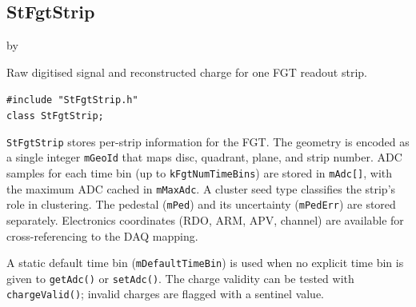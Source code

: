 \documentclass[twoside]{article}
\newcommand{\entrylabel}[1]{\mbox{\textbf{{#1}}}\hfil}%
\newenvironment{entry}
{\begin{list}{}%
    {\renewcommand{\makelabel}{\entrylabel}%
     \setlength{\labelwidth}{90pt}%
     \setlength{\leftmargin}{\labelwidth}
     \advance\leftmargin by \labelsep%
      }%
    }%
  {\end{list}}
\newcommand{\Entrylabel}[1]%
{\raisebox{0pt}[1ex][0pt]{\makebox[\labelwidth][l]%
    {\parbox[t]{\labelwidth}{\hspace{0pt}\textbf{{#1}}}}}}
\newenvironment{Entry}%
{\renewcommand{\entrylabel}{\Entrylabel}\begin{entry}}%
  {\end{entry}}
\begin{document}
\subsection{StFgtStrip}
\label{sec:StFgtStrip}
\begin{Entry}
\item[Summary] Raw digitised signal and reconstructed charge for one FGT readout strip.
\item[Synopsis]
    \verb+#include "StFgtStrip.h"+\\
    \verb+class StFgtStrip;+\\
\item[Description]
  \texttt{StFgtStrip} stores per-strip information for the FGT.  The geometry is encoded
  as a single integer \texttt{mGeoId} that maps disc, quadrant, plane, and strip number.
  ADC samples for each time bin (up to \texttt{kFgtNumTimeBins}) are stored in
  \texttt{mAdc[]}, with the maximum ADC cached in \texttt{mMaxAdc}.  A cluster seed type
  classifies the strip's role in clustering.  The pedestal (\texttt{mPed}) and its
  uncertainty (\texttt{mPedErr}) are stored separately.  Electronics coordinates (RDO,
  ARM, APV, channel) are available for cross-referencing to the DAQ mapping.

  A static default time bin (\texttt{mDefaultTimeBin}) is used when no explicit time bin
  is given to \texttt{getAdc()} or \texttt{setAdc()}.  The charge validity can be tested
  with \texttt{chargeValid()}; invalid charges are flagged with a sentinel value.


\end{Entry}
\end{document}
